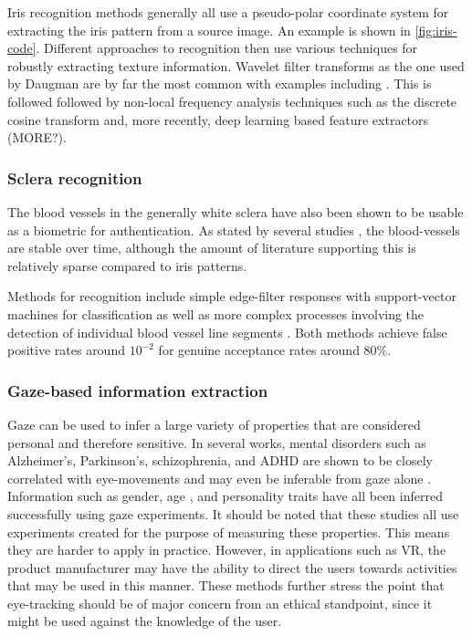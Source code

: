 Iris recognition methods generally all use a pseudo-polar coordinate system for extracting the iris pattern from a source image. An example is shown in \autoref{fig:iris-code}. Different approaches to recognition then use various techniques for robustly extracting texture information. Wavelet filter transforms as the one used by Daugman are by far the most common with examples including \parencite{daugman2007new, ma2002iris, ma2004efficient, poursaberi2006iris, rydgren2004iris, zhu2000biometric}. This is followed followed by non-local frequency analysis techniques such as the discrete cosine transform \cite{iris-dct, monroDCTBasedIrisRecognition2007} and, more recently, deep learning based feature extractors\cite{gangwarDeepIrisNetDeepIris2016, nguyenIrisRecognitionOfftheShelf2018} (MORE?).

\subsubsection{Sclera recognition}
The blood vessels in the generally white sclera have also been shown to be usable as a biometric for authentication. As stated by several studies \parencite{dasScleraRecognitionSurvey2013, zhouNewHumanIdentification2012}, the blood-vessels are stable over time, although the amount of literature supporting this is relatively sparse compared to iris patterns.

Methods for recognition include simple edge-filter responses with support-vector machines for classification \parencite{dasNewEfficientAdaptive2014} as well as more complex processes involving the detection of individual blood vessel line segments \parencite{zhouNewHumanIdentification2012}. Both methods achieve false positive rates around $10^{-2}$ for genuine acceptance rates around $80\%$.


\subsubsection{Gaze-based information extraction}
Gaze can be used to infer a large variety of properties that are considered personal and therefore sensitive. In several works, mental disorders such as Alzheimer's, Parkinson's, schizophrenia, and ADHD are shown to be closely correlated with eye-movements and may even be inferable from gaze alone \parencite{hutton1984eye, jayanthi2010automatic, holzman1974eye, galgani2009automatic}. Information such as gender, age \parencite{kuechenmeister1977eye}, and personality traits \parencite{hoppe2018eye} have all been inferred successfully using gaze experiments. It should be noted that these studies all use experiments created for the purpose of measuring these properties. This means they are harder to apply in practice. However, in applications such as VR, the product manufacturer may have the ability to direct the users towards activities that may be used in this manner. These methods further stress the point that eye-tracking should be of major concern from an ethical standpoint, since it might be used against the knowledge of the user. 

